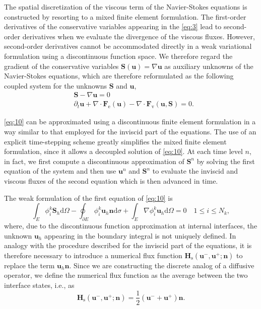 \documentclass{develop-note}
\begin{document}
The spatial discretization of the viscous term of the Navier-Stokes equations is constructed by resorting to a mixed finite element formulation. The first-order derivatives of the conservative variables appearing in the \autoref{eq:3} lead to second-order derivatives when we evaluate the divergence of the viscous fluxes. However, second-order derivatives cannot be accommodated directly in a weak variational formulation using a discontinuous function space. We therefore regard the gradient of the conservative variables $\mathbf{S}(\mathbf{u})=\nabla\mathbf{u}$ as auxiliary unknowns of the Navier-Stokes equations, which are therefore reformulated as the following coupled system for the unknowns $\mathbf{S}$ and $\mathbf{u}$,
\begin{equation}
  \label{eq:10}
  \begin{aligned}
    &\mathbf{S}-\nabla\mathbf{u}=0\\
    &\partial_{t}\mathbf{u}+\nabla\cdot\mathbf{F}_{\mathrm{e}}(\mathbf{u})-\nabla\cdot\mathbf{F}_{\mathrm{v}}(\mathbf{u},\mathbf{S})=0.
  \end{aligned}
\end{equation}

\autoref{eq:10} can be approximated using a discontinuous finite element formulation in a way similar to that employed for the inviscid part of the equations. The use of an explicit time-stepping scheme greatly simplifies the mixed finite element formulation, since it allows a decoupled solution of \autoref{eq:10}. At each time level $n$, in fact, we first compute a discontinuous approximation of $\mathbf{S}^{n}$ by solving the first equation of the system and then use $\mathbf{u}^{n}$ and $\mathbf{S}^{n}$ to evaluate the inviscid and viscous fluxes of the second equation which is then advanced in time.

The weak formulation of the first equation of \autoref{eq:10} is
\begin{equation}
  \label{eq:11}
  \int_{E}\phi_{i}^{k}\mathbf{S}_{h}\mathrm{d}\Omega-\oint_{\partial E}\phi_{i}^{k}\mathbf{u}_{h}\mathbf{n}\mathrm{d}\sigma+\int_{E}\nabla\phi_{i}^{k}\mathbf{u}_{h}\mathrm{d}\Omega=0\quad 1\leqslant i\leqslant N_{k},
\end{equation}
where, due to the discontinuous function approximation at internal interfaces, the unknown $\mathbf{u}_{h}$ appearing in the boundary integral is not uniquely defined. In analogy with the procedure described for the inviscid part of the equations, it is therefore necessary to introduce a numerical flux function $\mathbf{H}_{\mathrm{s}}(\mathbf{u}^{-},\mathbf{u}^{+};\mathbf{n})$ to replace the term $\mathbf{u}_{h}\mathbf{n}$. Since we are constructing the discrete analog of a diffusive operator, we define the numerical flux function as the average between the two interface states, i.e., as
\begin{equation}
  \label{eq:12}
  \mathbf{H}_{\mathrm{s}}(\mathbf{u}^{-},\mathbf{u}^{+};\mathbf{n})=\dfrac{1}{2}(\mathbf{u}^{-}+\mathbf{u}^{+})\mathbf{n}.
\end{equation}
\end{document}
